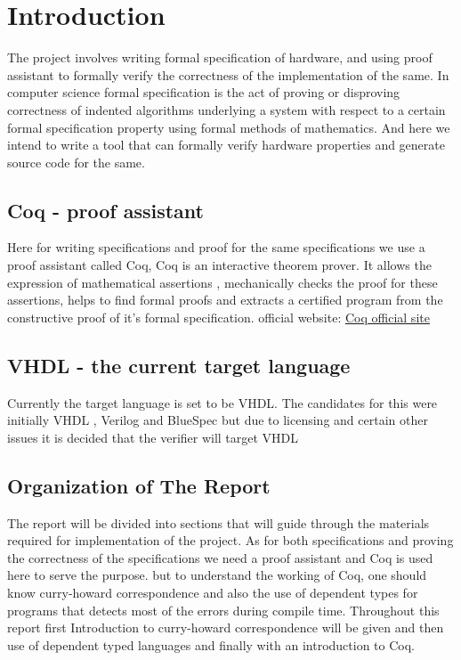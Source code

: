 \chapter{Introduction}
\hspace{3mm}
    The project involves writing formal specification of hardware, and using proof assistant to
formally verify the correctness of the implementation of the same. In computer science formal specification
is the act of proving or disproving correctness of indented algorithms underlying a system with respect to a 
certain formal specification property using formal methods of mathematics. And here we intend to write a tool
that can formally verify hardware properties and generate source code for the same.

\section{Coq -  proof assistant}
    Here for writing specifications and proof for the same specifications we use a proof assistant called
Coq, Coq is an interactive theorem prover. It allows the expression of mathematical assertions , mechanically
checks the proof for these assertions, helps to find formal proofs and extracts a certified program from the
constructive proof of it's formal specification. official website: \href{https://coq.inria.fr/}{Coq official site}

\section{VHDL -  the current target language}
    Currently the target language is set to be VHDL. The candidates for this were initially VHDL , Verilog
and BlueSpec but due to licensing and certain other issues it is decided that the verifier will target VHDL


\section{Organization of The Report}
    The report will be divided into sections that will guide through the materials required for implementation
of the project. As for both specifications and proving the correctness of the specifications we need a proof assistant
and Coq is used here to serve the purpose. but to understand the working of Coq, one should know curry-howard
correspondence and also the use of dependent types for programs that detects most of the errors during compile time.
Throughout this report first Introduction to curry-howard correspondence will be given and then use of dependent typed
languages and finally with an introduction to Coq. 